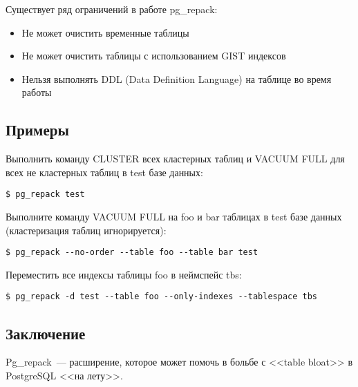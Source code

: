 Существует ряд ограничений в работе pg\_repack:

\begin{itemize}
  \item Не может очистить временные таблицы
  \item Не может очистить таблицы с использованием GIST индексов
  \item Нельзя выполнять DDL (Data Definition Language) на таблице во время работы
\end{itemize}

\subsection{Примеры}

Выполнить команду CLUSTER всех кластерных таблиц и VACUUM FULL для всех не кластерных таблиц в test базе данных:

\begin{lstlisting}[label=lst:pgrepack1]
$ pg_repack test
\end{lstlisting}

Выполните команду VACUUM FULL на foo и bar таблицах в test базе данных (кластеризация таблиц игнорируется):

\begin{lstlisting}[label=lst:pgrepack2]
$ pg_repack --no-order --table foo --table bar test
\end{lstlisting}

Переместить все индексы таблицы foo в неймспейс tbs:

\begin{lstlisting}[label=lst:pgrepack3]
$ pg_repack -d test --table foo --only-indexes --tablespace tbs
\end{lstlisting}

\subsection{Заключение}
Pg\_repack~--- расширение, которое может помочь в больбе с <<table bloat>> в PostgreSQL <<на лету>>.